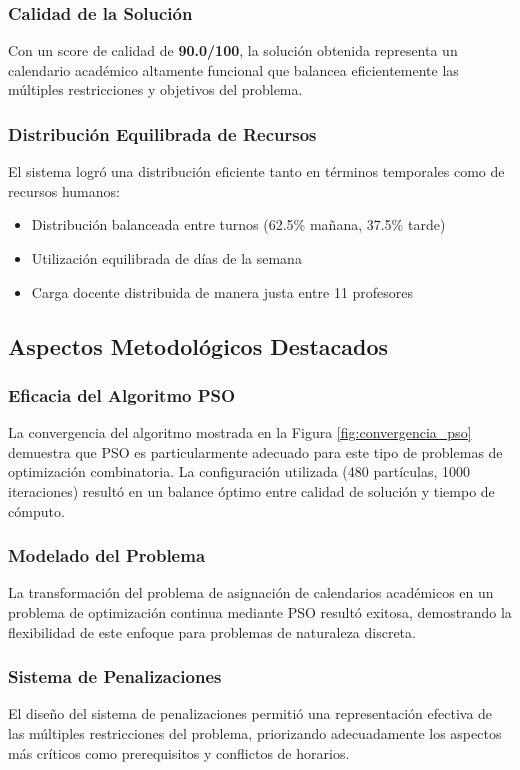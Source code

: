 \subsubsection{Calidad de la Solución}
Con un score de calidad de \textbf{90.0/100}, la solución obtenida representa un calendario académico altamente funcional que balancea eficientemente las múltiples restricciones y objetivos del problema.

\subsubsection{Distribución Equilibrada de Recursos}
El sistema logró una distribución eficiente tanto en términos temporales como de recursos humanos:
\begin{itemize}
    \item Distribución balanceada entre turnos (62.5\% mañana, 37.5\% tarde)
    \item Utilización equilibrada de días de la semana
    \item Carga docente distribuida de manera justa entre 11 profesores
\end{itemize}

\subsection{Aspectos Metodológicos Destacados}

\subsubsection{Eficacia del Algoritmo PSO}
La convergencia del algoritmo mostrada en la Figura \ref{fig:convergencia_pso} demuestra que PSO es particularmente adecuado para este tipo de problemas de optimización combinatoria. La configuración utilizada (480 partículas, 1000 iteraciones) resultó en un balance óptimo entre calidad de solución y tiempo de cómputo.

\subsubsection{Modelado del Problema}
La transformación del problema de asignación de calendarios académicos en un problema de optimización continua mediante PSO resultó exitosa, demostrando la flexibilidad de este enfoque para problemas de naturaleza discreta.

\subsubsection{Sistema de Penalizaciones}
El diseño del sistema de penalizaciones permitió una representación efectiva de las múltiples restricciones del problema, priorizando adecuadamente los aspectos más críticos como prerequisitos y conflictos de horarios.

